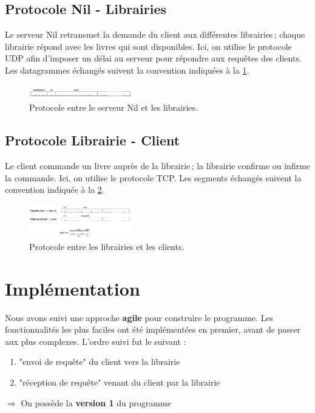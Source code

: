 \documentclass[
  french,
  twocolumn,
	9pt, %
]{fphw}
\begin{document}
\subsection{Protocole Nil - Librairies}

Le serveur Nil retransmet la demande du client aux différentes librairies ; chaque librairie répond avec les livres qui sont disponibles. Ici, on utilise le protocole UDP afin d'imposer un délai au serveur pour répondre aux requêtes des clients. Les datagrammes échangés suivent la convention indiquées à la \cref{fig:nil-lib}.
\begin{figure}[H]
	\centering
	\includegraphics[width=0.4\textwidth]{nil-lib.png}
	\caption{Protocole entre le serveur Nil et les librairies.}
	\label{fig:nil-lib}
\end{figure}


\subsection{Protocole Librairie - Client}

Le client commande un livre auprès de la librairie ; la librairie confirme ou infirme la commande. Ici, on utilise le protocole TCP. Les segments échangés suivent la convention indiquée à la \cref{fig:lib-client}.
\begin{figure}[H]
	\centering
	\includegraphics[width=0.4\textwidth]{lib-client.png}
	\caption{Protocole entre les librairies et les clients.}
	\label{fig:lib-client}
\end{figure}


\section{Implémentation}

Nous avons suivi une approche \textbf{agile} pour construire le programme. Les fonctionnalités les plus faciles ont été implémentées en premier, avant de passer aux plus complexes. L'ordre suivi fut le suivant :
\begin{enumerate}
  \item "envoi de requête" du client vers la librairie 
  \item "réception de requête" venant du client par la librairie
\end{enumerate}
$\Longrightarrow$ On possède la \textbf{version 1} du programme
\end{document}

